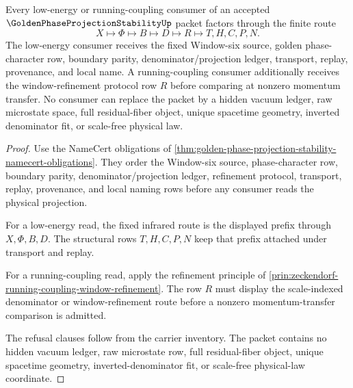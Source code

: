 \begin{theorem}
\label{thm:golden-phase-projection-stability-physical-handoff}
Every low-energy or running-coupling consumer of an accepted $\GoldenPhaseProjectionStabilityUp$ packet factors through the finite route
$$
X \longmapsto \Phi \longmapsto B \longmapsto D \longmapsto R \longmapsto T,H,C,P,N .
$$
The low-energy consumer receives the fixed Window-six source, golden phase-character row, boundary parity, denominator/projection ledger, transport, replay, provenance, and local name. A running-coupling consumer additionally receives the window-refinement protocol row $R$ before comparing at nonzero momentum transfer. No consumer can replace the packet by a hidden vacuum ledger, raw microstate space, full residual-fiber object, unique spacetime geometry, inverted denominator fit, or scale-free physical law.
\end{theorem}
\begin{proof}
Use the NameCert obligations of \autoref{thm:golden-phase-projection-stability-namecert-obligations}. They order the Window-six source, phase-character row, boundary parity, denominator/projection ledger, refinement protocol, transport, replay, provenance, and local naming rows before any consumer reads the physical projection.

For a low-energy read, the fixed infrared route is the displayed prefix through $X,\Phi,B,D$. The structural rows $T,H,C,P,N$ keep that prefix attached under transport and replay.

For a running-coupling read, apply the refinement principle of \autoref{prin:zeckendorf-running-coupling-window-refinement}. The row $R$ must display the scale-indexed denominator or window-refinement route before a nonzero momentum-transfer comparison is admitted.

The refusal clauses follow from the carrier inventory. The packet contains no hidden vacuum ledger, raw microstate row, full residual-fiber object, unique spacetime geometry, inverted-denominator fit, or scale-free physical-law coordinate.
\end{proof}



